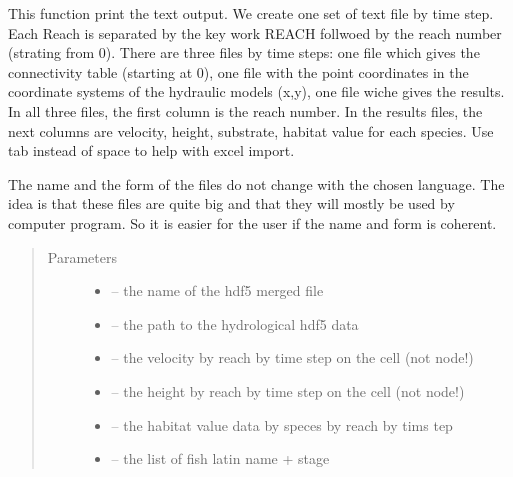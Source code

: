 \documentclass[letterpaper,10pt,english]{sphinxmanual}
\begin{document}
\begin{fulllineitems}
\label{\detokenize{index:src.calcul_hab.save_hab_txt}}
This function print the text output. We create one set of text file by time step. Each Reach is separated by the
key work REACH follwoed by the reach number (strating from 0). There are three files by time steps: one file which
gives the connectivity table (starting at 0), one file with the point coordinates in the
coordinate systems of the hydraulic models (x,y), one file wiche gives the results.
In all three files, the first column is the reach number. In the results files, the next columns are velocity,
height, substrate, habitat value for each species. Use tab instead of space to help with excel import.

The name and the form of the files do not change with the chosen language. The idea is that these files are quite big
and that they will mostly be used by computer program. So it is easier for the user if the name and form is coherent.
\begin{quote}\begin{description}
\item[{Parameters}] \leavevmode\begin{itemize}
\item {} 
 -- the name of the hdf5 merged file

\item {} 
 -- the path to the hydrological hdf5 data

\item {} 
 -- the velocity by reach by time step on the cell (not node!)

\item {} 
 -- the height by reach by time step on the cell (not node!)

\item {} 
 -- the habitat value data by speces by reach by tims tep

\item {} 
 -- the list of fish latin name + stage


\end{itemize}
\end{description}
\end{quote}
\end{fulllineitems}
\end{document}

